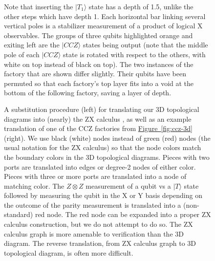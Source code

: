 \documentclass[superscriptaddress,notitlepage,longbibliography]{revtex4-1}
\newcommand{\fig}[1]{\hyperref[fig:#1]{Figure~\ref*{fig:#1}}}
\begin{document}
\begin{figure}[ht]
{    Note that inserting the $|T_1\rangle$ state has a depth of 1.5, unlike the other steps which have depth 1.
    Each horizontal bar linking several vertical poles is a stabilizer measurement of a product of logical X observables.
    The groups of three qubits highlighted orange and exiting left are the $|CCZ\rangle$ states being output (note that the middle pole of each $|CCZ\rangle$ state is rotated with respect to the others, with white on top instead of black on top).
    The two instances of the factory that are shown differ slightly.
    Their qubits have been permuted so that each factory's top layer fits into a void at the bottom of the following factory, saving a layer of depth.
  }
\end{figure}

\begin{figure}[ht]
  \label{fig:ccz-graph}
  \caption{
    A substitution procedure (left) for translating our 3D topological diagrams into (nearly) the ZX calculus \cite{de2017}, as well as an example translation of one of the CCZ factories from \fig{ccz-3d} (right).
    We use black (white) nodes instead of green (red) nodes (the usual notation for the ZX calculus) so that the node colors match the boundary colors in the 3D topological diagrams.
    Pieces with two ports are translated into edges or degree-2 nodes of either color.
    Pieces with three or more ports are translated into a node of matching color.
    The $Z \otimes Z$ measurement of a qubit vs a $|T\rangle$ state followed by measuring the qubit in the X or Y basis depending on the outcome of the parity measurement is translated into a (non-standard) red node.
    The red node can be expanded into a proper ZX calculus construction, but we do not attempt to do so.
    The ZX calculus graph is more amenable to verification than the 3D diagram.
    The reverse translation, from ZX calculus graph to 3D topological diagram, is often more difficult.
  }
\end{figure}
\end{document}
